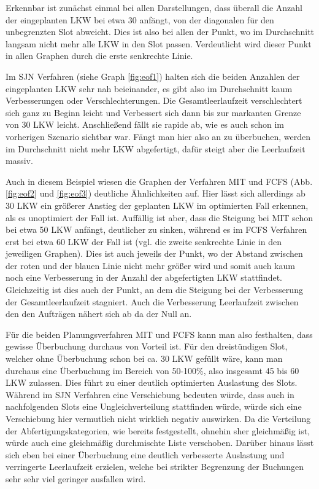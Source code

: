 Erkennbar ist zunächst einmal bei allen Darstellungen, dass überall die Anzahl der eingeplanten LKW bei etwa 30 anfängt, von der diagonalen für den unbegrenzten Slot abweicht. Dies ist also bei allen der Punkt, wo im Durchschnitt langsam nicht mehr alle LKW in den Slot passen. Verdeutlicht wird dieser Punkt in allen Graphen durch die erste senkrechte Linie.

Im SJN Verfahren (siehe Graph \ref{fig:eof1}) halten sich die beiden Anzahlen der eingeplanten LKW sehr nah beieinander, es gibt also im Durchschnitt kaum Verbesserungen oder Verschlechterungen. Die Gesamtleerlaufzeit verschlechtert sich ganz zu Beginn leicht und Verbessert sich dann bis zur markanten Grenze von 30 LKW leicht. Anschließend fällt sie rapide ab, wie es auch schon im vorherigen Szenario sichtbar war. Fängt man hier also an zu überbuchen, werden im Durchschnitt nicht mehr LKW abgefertigt, dafür steigt aber die Leerlaufzeit massiv. 

Auch in diesem Beispiel wiesen die Graphen der Verfahren MIT und FCFS (Abb. \ref{fig:eof2} und \ref{fig:eof3}) deutliche Ähnlichkeiten auf. Hier lässt sich allerdings ab 30 LKW ein größerer Anstieg der geplanten LKW im optimierten Fall erkennen, als es unoptimiert der Fall ist. Auffällig ist aber, dass die Steigung bei MIT schon bei etwa 50 LKW anfängt, deutlicher zu sinken, während es im FCFS Verfahren erst bei etwa 60 LKW der Fall ist (vgl. die zweite senkrechte Linie in den jeweiligen Graphen). Dies ist auch jeweils der Punkt, wo der Abstand zwischen der roten und der blauen Linie nicht mehr größer wird und somit auch kaum noch eine Verbesserung in der Anzahl der abgefertigten LKW stattfindet. Gleichzeitig ist dies auch der Punkt, an dem die Steigung bei der Verbesserung der Gesamtleerlaufzeit stagniert. Auch die Verbesserung Leerlaufzeit zwischen den den Aufträgen nähert sich ab da der Null an. 

Für die beiden Planungsverfahren MIT und FCFS kann man also festhalten, dass gewisse Überbuchung durchaus von Vorteil ist. Für den dreistündigen Slot, welcher ohne Überbuchung schon bei ca. 30 LKW gefüllt wäre, kann man durchaus eine Überbuchung im Bereich von 50-100\%, also insgesamt 45 bis 60 LKW zulassen. Dies führt zu einer deutlich optimierten Auslastung des Slots. Während im SJN Verfahren eine Verschiebung bedeuten würde, dass auch in nachfolgenden Slots eine Ungleichverteilung stattfinden würde, würde sich eine Verschiebung hier vermutlich nicht wirklich negativ auswirken. Da die Verteilung der Abfertigungskategorien, wie bereits festgestellt, ohnehin sher gleichmäßig ist, würde auch eine gleichmäßig durchmischte Liste verschoben. Darüber hinaus lässt sich eben bei einer Überbuchung eine deutlich verbesserte Auslastung und verringerte Leerlaufzeit erzielen, welche bei strikter Begrenzung der Buchungen sehr sehr viel geringer ausfallen wird.


